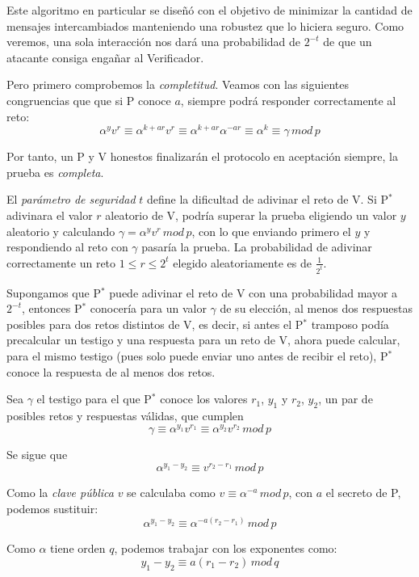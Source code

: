 \hfil

Este algoritmo en particular se diseñó con el objetivo de minimizar la cantidad de mensajes intercambiados manteniendo una robustez que lo hiciera seguro. Como veremos, una sola interacción nos dará una probabilidad de $2^{-t}$ de que un atacante consiga engañar al Verificador.


Pero primero comprobemos la \textit{completitud}. Veamos con las siguientes congruencias que que si P conoce $a$, siempre podrá responder correctamente al reto:
\[
\alpha^y v^r \equiv \alpha ^{k+ar} v^r \equiv \alpha^{k+ar} \alpha ^{-a r} \equiv \alpha ^k \equiv \gamma \, mod \, p
\]

Por tanto, un P y V honestos finalizarán el protocolo en aceptación siempre, la prueba es \textit{completa}.

\hfil

El \textit{parámetro de seguridad} $t$ define la dificultad de adivinar el reto de V. Si P$^*$ adivinara el valor $r$ aleatorio de V, podría superar la prueba eligiendo un valor $y$ aleatorio y calculando $\gamma = \alpha ^y v ^r \, mod \, p$, con lo que enviando primero el $y$ y respondiendo al reto con $\gamma$ pasaría la prueba. La probabilidad de adivinar correctamente un reto $1\leq r\leq 2^t$ elegido aleatoriamente es de $\frac{1}{2^t}$.


Supongamos que P$^*$ puede adivinar el reto de V con una probabilidad mayor a $2^{-t}$, entonces P$^*$ conocería para un valor $\gamma$ de su elección, al menos dos respuestas posibles para dos retos distintos de V, es decir, si antes el P$^*$ tramposo podía precalcular un testigo y una respuesta para un reto de V, ahora puede calcular, para el mismo testigo (pues solo puede enviar uno antes de recibir el reto), P$^*$ conoce la respuesta de al menos dos retos.

Sea $\gamma$ el testigo para el que P$^*$ conoce los valores $r_1$, $y_1$ y $r_2$, $y_2$, un par de posibles retos y respuestas válidas, que cumplen
\[
	\gamma \equiv \alpha^{y_1} v^{r_1} \equiv \alpha^{y_2} v^{r_2} \, mod \, p
\]

Se sigue que
\[
	\alpha^{y_1 - y_2} \equiv v ^{r_2 - r_1}  \, mod \, p
\]

Como la \textit{clave pública} $v$ se calculaba como $v\equiv \alpha^{-a} \, mod \, p$, con $a$ el secreto de P, podemos sustituir:
\[
	\alpha^{y_1 - y_2} \equiv \alpha ^{-a(r_2 - r_1)}  \, mod \, p
\]

Como $\alpha$ tiene orden $q$, podemos trabajar con los exponentes como:
\[
	y_1 - y_2 \equiv a(r_1 - r_2) \, mod \, q
\]

